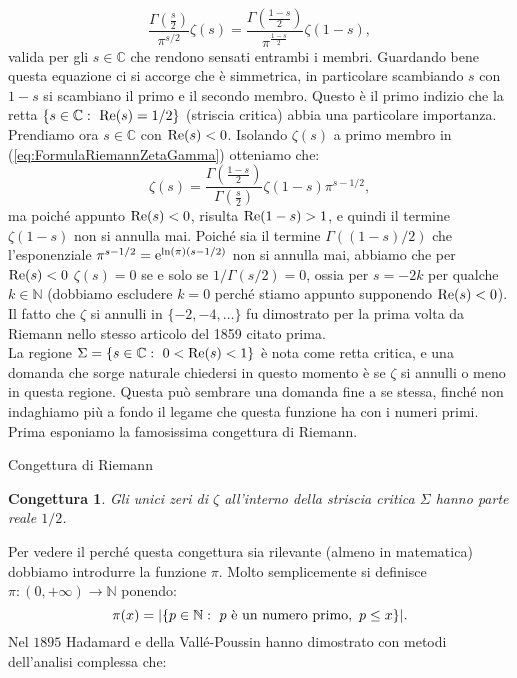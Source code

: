 \documentclass[11pt]{book}
\theoremstyle{Definizione}
\theoremstyle{TeoremaProposizioneLemmaCorollarioCongettura}
\newtheorem{mycon}[myteo]{Congettura}
\theoremstyle{OsservazioneNotaEsempio}
\newcommand{\N}{\mathbb{N}}
\newcommand{\C}{\mathbb{C}}
\renewcommand{\Re}{\textup{Re}}
\newcommand{\e}{\textup{e}}
\begin{document}
\begin{equation}\label{eq:FormulaRiemannZetaGamma}
\frac{\displaystyle\Gamma\left(\frac{s}{2}\right)}{\displaystyle\pi^{s/2}} \zeta(s) = \frac{\displaystyle\Gamma\left(\frac{1-s}{2}\right)}{\displaystyle\pi^{\frac{1-s}{2}}}\zeta(1-s),
\end{equation}
valida per gli $s\in \C$ che rendono sensati entrambi i membri. Guardando bene questa equazione ci si accorge che è simmetrica, in particolare scambiando $s$ con $1-s$ si scambiano il primo e il secondo membro. Questo è il primo indizio che la retta $\{s\in \C:\ \Re(s) = 1/2\}$ (striscia critica) abbia una particolare importanza.\\
Prendiamo ora $s\in \C$ con $\Re(s) < 0$. Isolando $\zeta(s)$ a primo membro in (\ref{eq:FormulaRiemannZetaGamma}) otteniamo che:
$$
\zeta(s) = \frac{\displaystyle \Gamma\left(\frac{1-s}{2}\right)}{\displaystyle\Gamma\left(\frac{s}{2}\right)} \zeta(1-s) \pi^{s-1/2},
$$
ma poiché appunto $\Re(s) < 0$, risulta $\Re(1-s) > 1$, e quindi il termine $\zeta(1-s)$ non si annulla mai. Poiché sia il termine $\Gamma((1-s)/2)$ che l'esponenziale $\pi^{s-1/2} = \e^{\ln(\pi)(s-1/2)}$ non si annulla mai, abbiamo che per $\Re(s) < 0$ $\zeta(s) = 0$ se e solo se $1/\Gamma(s/2) = 0$, ossia per $s = -2k$ per qualche $k\in \N$ (dobbiamo escludere $k = 0$ perché stiamo appunto supponendo $\Re(s) < 0$). Il fatto che $\zeta$ si annulli in $\{-2,-4,\dots\}$ fu dimostrato per la prima volta da Riemann nello stesso articolo del 1859 citato prima.\\
\indent
La regione $\Sigma = \{s\in \C:\ 0 < \Re(s) < 1\}$ è nota come retta critica, e una domanda che sorge naturale chiedersi in questo momento è se $\zeta$ si annulli o meno in questa regione. Questa può sembrare una domanda fine a se stessa, finché non indaghiamo più a fondo il legame che questa funzione ha con i numeri primi. Prima esponiamo la famosissima congettura di Riemann.
\begin{boxcon}{Congettura di Riemann}
\begin{mycon}
Gli unici zeri di $\zeta$ all'interno della striscia critica $\Sigma$ hanno parte reale $1/2$.
\end{mycon}
\end{boxcon}
\noindent
Per vedere il perché questa congettura sia rilevante (almeno in matematica) dobbiamo introdurre la funzione $\pi$. Molto semplicemente si definisce $\pi:(0,+\infty)\longrightarrow \N$ ponendo:
$$
\pi(x) = |\{p\in \N:\ p\textup{ è un numero primo},\ p\leq x\}|.
$$
Nel $1895$ Hadamard e della Vallé-Poussin hanno dimostrato con metodi dell'analisi complessa che:
\end{document}
